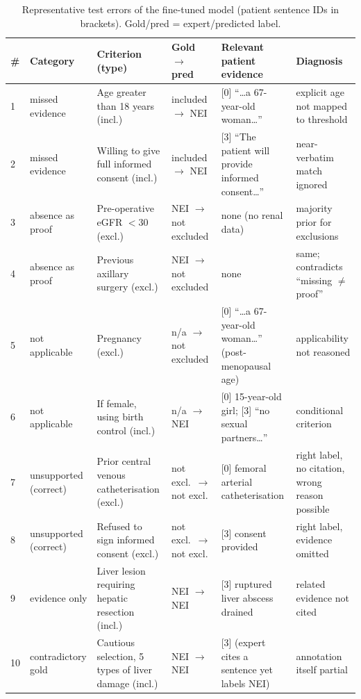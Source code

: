 \begin{table}[t]\centering\caption{Representative test errors of the fine-tuned model (patient sentence IDs in brackets). Gold/pred = expert/predicted label.}\label{tab:errors}
\footnotesize\setlength{\tabcolsep}{3pt}
\begin{tabular}{p{0.3cm}p{2.2cm}p{4.3cm}p{2.2cm}p{4.8cm}p{2.6cm}}\toprule
\# & Category & Criterion (type) & Gold $\rightarrow$ pred & Relevant patient evidence & Diagnosis\\\midrule
1 & missed evidence & Age greater than 18 years (incl.) & included $\rightarrow$ NEI & [0] ``\ldots a 67-year-old woman\ldots'' & explicit age not mapped to threshold\\
2 & missed evidence & Willing to give full informed consent (incl.) & included $\rightarrow$ NEI & [3] ``The patient will provide informed consent\ldots'' & near-verbatim match ignored\\
3 & absence as proof & Pre-operative eGFR $<$30 (excl.) & NEI $\rightarrow$ not excluded & none (no renal data) & majority prior for exclusions\\
4 & absence as proof & Previous axillary surgery (excl.) & NEI $\rightarrow$ not excluded & none & same; contradicts ``missing $\neq$ proof''\\
5 & not applicable & Pregnancy (excl.) & n/a $\rightarrow$ not excluded & [0] ``\ldots a 67-year-old woman\ldots'' (post-menopausal age) & applicability not reasoned\\
6 & not applicable & If female, using birth control (incl.) & n/a $\rightarrow$ NEI & [0] 15-year-old girl; [3] ``no sexual partners\ldots'' & conditional criterion\\
7 & unsupported (correct) & Prior central venous catheterisation (excl.) & not excl.\ $\rightarrow$ not excl. & [0] femoral arterial catheterisation & right label, no citation, wrong reason possible\\
8 & unsupported (correct) & Refused to sign informed consent (excl.) & not excl.\ $\rightarrow$ not excl. & [3] consent provided & right label, evidence omitted\\
9 & evidence only & Liver lesion requiring hepatic resection (incl.) & NEI $\rightarrow$ NEI & [3] ruptured liver abscess drained & related evidence not cited\\
10 & contradictory gold & Cautious selection, 5 types of liver damage (incl.) & NEI $\rightarrow$ NEI & [3] (expert cites a sentence yet labels NEI) & annotation itself partial\\
\bottomrule\end{tabular}\end{table}

